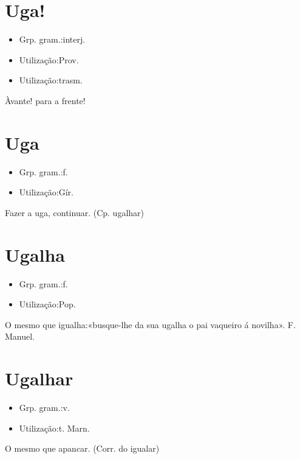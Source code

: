 \documentclass{article}
\begin{document}
\section{Uga!}
\begin{itemize}
\item {Grp. gram.:interj.}
\end{itemize}
\begin{itemize}
\item {Utilização:Prov.}
\end{itemize}
\begin{itemize}
\item {Utilização:trasm.}
\end{itemize}
Àvante! para a frente!
\section{Uga}
\begin{itemize}
\item {Grp. gram.:f.}
\end{itemize}
\begin{itemize}
\item {Utilização:Gír.}
\end{itemize}
\textunderscore Fazer a uga\textunderscore , continuar.
(Cp. \textunderscore ugalhar\textunderscore )
\section{Ugalha}
\begin{itemize}
\item {Grp. gram.:f.}
\end{itemize}
\begin{itemize}
\item {Utilização:Pop.}
\end{itemize}
O mesmo que \textunderscore igualha\textunderscore :«\textunderscore busque-lhe da sua ugalha o pai vaqueiro á novilha\textunderscore ». F. Manuel.
\section{Ugalhar}
\begin{itemize}
\item {Grp. gram.:v.}
\end{itemize}
\begin{itemize}
\item {Utilização:t. Marn.}
\end{itemize}
O mesmo que \textunderscore apancar\textunderscore .
(Corr. do \textunderscore igualar\textunderscore )
\end{document}
